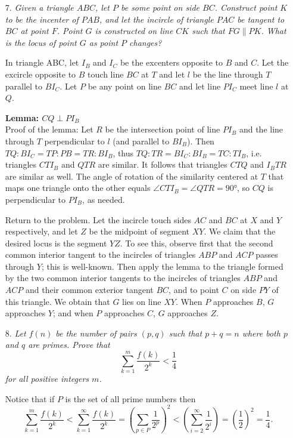 \documentclass{article}
\begin{document}
\begin{enumerate}
\medskip
\item[7.] %
\textit{Given a triangle $ABC$, let $P$ be some point on side $BC$. Construct point $K$ to be the incenter of $PAB$, and let the incircle of triangle $PAC$ be tangent to $BC$ at point $F$. Point $G$ is constructed on line $CK$ such that $FG \parallel PK$. What is the locus of point $G$ as point $P$ changes?}

In triangle ABC, let $I_B$ and $I_C$ be the excenters opposite to $B$ and $C$. Let the excircle opposite to $B$ touch line $BC$ at $T$ and let $l$ be the line through $T$ parallel to $BI_C$. Let $P$ be any point on line $BC$ and let line $PI_C$ meet line $l$ at $Q$.

\textbf{Lemma: $CQ \perp PI_B$} \\
Proof of the lemma: Let $R$ be the intersection point of line $PI_B$ and the line through $T$ perpendicular to $l$ (and parallel to $BI_B$). 
Then $TQ : BI_C = TP : PB = TR : BI_B$, thus $TQ : TR = BI_C : BI_B = TC : TI_B$, i.e. triangles $CTI_B$ and $QTR$ are similar. It follows that triangles $CTQ$ and $I_BTR$ are similar as well. 
The angle of rotation of the similarity centered at $T$ that maps one triangle onto the other equals $\angle CTI_B = \angle QTR = 90 \si{\degree}$, so $CQ$ is perpendicular to $PI_B$, as needed.

Return to the problem. Let the incircle touch sides $AC$ and $BC$ at $X$ and $Y$ respectively, and let $Z$ be the midpoint of segment $XY$.
We claim that the desired locus is the segment $YZ$. To see this, observe first that the second common interior tangent to the incircles of triangles $ABP$ and $ACP$ passes through $Y$; this is well-known.
Then apply the lemma to the triangle formed by the two common interior tangents to the incircles of triangles $ABP$ and $ACP$ and their common
exterior tangent $BC$, and to point $C$ on side $PY$ of this triangle. 
We obtain that $G$ lies on line $XY$. When $P$ approaches $B$, $G$ approaches $Y$; and when $P$ approaches $C$, $G$ approaches $Z$.

\medskip
\item[8.] %
\textit{Let $f(n)$ be the number of pairs $(p, q)$ such that $p + q = n$ where both $p$ and $q$ are primes. Prove that
$$\sum_{k = 1}^{m} \frac{f(k)}{2^k} < \frac{1}{4}$$
for all positive integers $m$.}

Notice that if $P$ is the set of all prime numbers then
$$\sum_{k = 1}^{m} \frac{f(k)}{2^k} < \sum_{k = 1}^{\infty} \frac{f(k)}{2^k} = (\sum_{p \in P} \frac{1}{2^p})^2 < (\sum_{i = 2}^{\infty} \frac{1}{2^i}) = (\frac{1}{2})^2 = \frac{1}{4}.$$

\end{enumerate}
\end{document}
